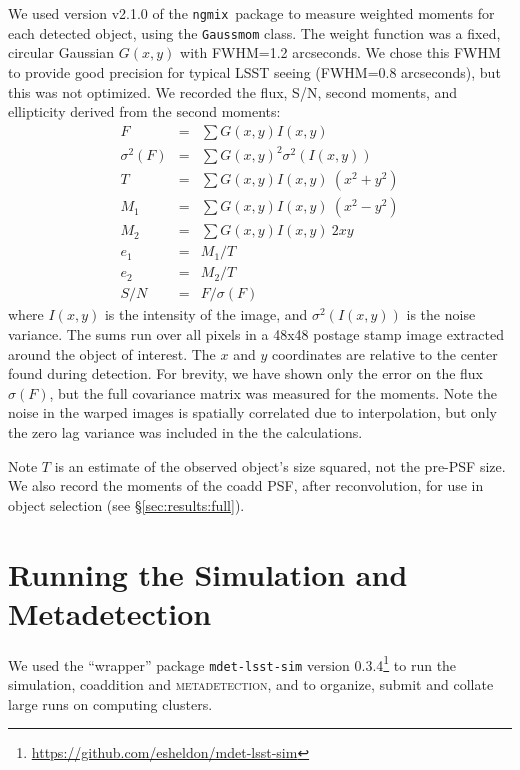 \documentclass[twocolumn,twocolappendix,astrosym]{openjournal}
\newcommand{\ngmix}{\texttt{ngmix}}
\newcommand{\mdet}{\textsc{metadetection}}
\begin{document}
We used version v2.1.0 of the \ngmix\ package to measure weighted moments for
each detected object, using the \texttt{Gaussmom} class. The weight function
was a fixed, circular Gaussian $G(x, y)$ with FWHM=1.2 arcseconds. We chose
this FWHM to provide good precision for typical LSST seeing (FWHM=0.8
arcseconds), but this was not optimized.  We recorded the flux, S/N, second
moments, and ellipticity derived from the second moments:
\begin{eqnarray} \label{eq:moments}
    F &=& \sum G(x, y) I(x, y) \nonumber \\
    \sigma^2(F) &=& \sum G(x, y)^2 \sigma^2(I(x, y)) \nonumber \\
    T &=& \sum G(x, y) I(x, y) ~ (x^2 + y^2) \nonumber \\
    M_1 &=& \sum G(x, y) I(x, y) ~ (x^2 - y^2) \\
    M_2 &=& \sum G(x, y) I(x, y) ~ 2 x y \nonumber \\
    e_1 &=& M_1 / T \nonumber \\
    e_2 &=& M_2 / T \nonumber \\
    S/N &=& F / \sigma(F) \nonumber
\end{eqnarray}
where $I(x, y)$ is the intensity of the image, and $\sigma^2(I(x, y))$ is the
noise variance. The sums run over all pixels in a 48x48 postage stamp image
extracted around the object of interest.  The $x$ and $y$ coordinates are
relative to the center found during detection. For brevity, we have shown only
the error on the flux $\sigma(F)$, but the full covariance matrix was measured
for the moments.  Note the noise in the warped images is spatially correlated
due to interpolation, but only the zero lag variance was included in the
the calculations.

Note $T$ is an estimate of the observed object's size squared, not the
pre-PSF size.  We also record the moments of the coadd PSF, after
reconvolution, for use in object selection (see \S \ref{sec:results:full}).

\section{Running the Simulation and Metadetection} \label{sec:running}

We used the ``wrapper'' package \texttt{mdet-lsst-sim} version
0.3.4\footnote{\url{https://github.com/esheldon/mdet-lsst-sim}} to run the
simulation, coaddition and \mdet, and to organize, submit and collate large
runs on computing clusters.
\end{document}
